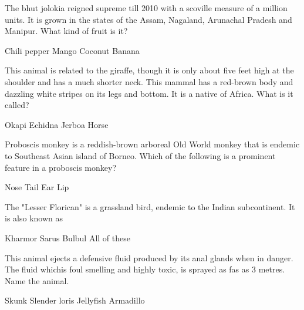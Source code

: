 \documentclass[a4paper,12pt,answers]{exam}
\begin{document}
\begin{questions}
    \question The bhut jolokia reigned supreme till 2010 with a scoville measure of a million units. It is grown in the states of the Assam, Nagaland, Arunachal Pradesh and Manipur. What kind of fruit is it?

    \begin{randomizeoneparchoices}
        \CorrectChoice Chili pepper
        \choice Mango
        \choice Coconut
        \choice Banana
    \end{randomizeoneparchoices}
    
    \question This animal is related to the giraffe, though it is only about five feet high at the shoulder and has a much shorter neck. This mammal has a red-brown body and dazzling white stripes on its legs and bottom. It is a native of Africa. What is it called?

    \begin{randomizeoneparchoices}
        \CorrectChoice Okapi
        \choice Echidna
        \choice Jerboa
        \choice Horse
    \end{randomizeoneparchoices}
    
    \question Proboscis monkey is a reddish-brown arboreal Old World monkey that is endemic to Southeast Asian island of Borneo. Which of the following is a prominent feature in a proboscis monkey?

    \begin{randomizeoneparchoices}
        \CorrectChoice Nose
        \choice Tail
        \choice Ear
        \choice Lip
    \end{randomizeoneparchoices}
    
    \question The "Lesser Florican" is a grassland bird, endemic to the Indian subcontinent. It is also known as \fillin

    \begin{randomizeoneparchoices}
        \CorrectChoice Kharmor
        \choice Sarus
        \choice Bulbul
        \choice All of these
    \end{randomizeoneparchoices}
    
    \question This animal ejects a defensive fluid produced by its anal glands when in danger. The fluid whichis foul smelling and highly toxic, is sprayed as fas as 3 metres. Name the animal.

    \begin{randomizeoneparchoices}
        \CorrectChoice Skunk
        \choice Slender loris
        \choice Jellyfish
        \choice Armadillo
    \end{randomizeoneparchoices}
    

\end{questions}
\end{document}
